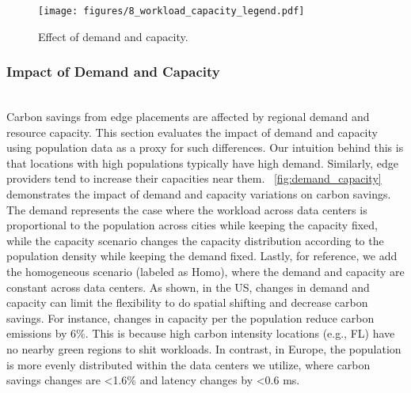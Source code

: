 \begin{figure}[tb]
    \centering
    \texttt{[image: figures/8\_workload\_capacity\_legend.pdf]} \\
    \quad
    \caption{Effect of demand and capacity. }
    \label{fig:demand_capacity}
\end{figure}

\subsubsection{Impact of Demand and Capacity}\label{sec:eval_demand_capacity}\hfill\\
Carbon savings from edge placements are affected by regional demand and resource capacity. This section evaluates the impact of demand and capacity using population data as a proxy for such differences. Our intuition behind this is that locations with high populations typically have high demand. Similarly, edge providers tend to increase their capacities near them.
~\autoref{fig:demand_capacity} demonstrates the impact of demand and capacity variations on carbon savings. The demand represents the case where the workload across data centers is proportional to the population across cities while keeping the capacity fixed, while the capacity scenario changes the capacity distribution according to the population density while keeping the demand fixed. Lastly, for reference, we add the homogeneous scenario (labeled as Homo), where the demand and capacity are constant across data centers.  
As shown, in the US, changes in demand and capacity can limit the flexibility to do spatial shifting and decrease carbon savings. For instance, changes in capacity per the population reduce carbon emissions by 6\%. This is because high carbon intensity locations (e.g., FL) have no nearby green regions to shit workloads. In contrast, in Europe, the population is more evenly distributed within the data centers we utilize, where carbon savings changes are <1.6\% and latency changes by <0.6 ms. 


